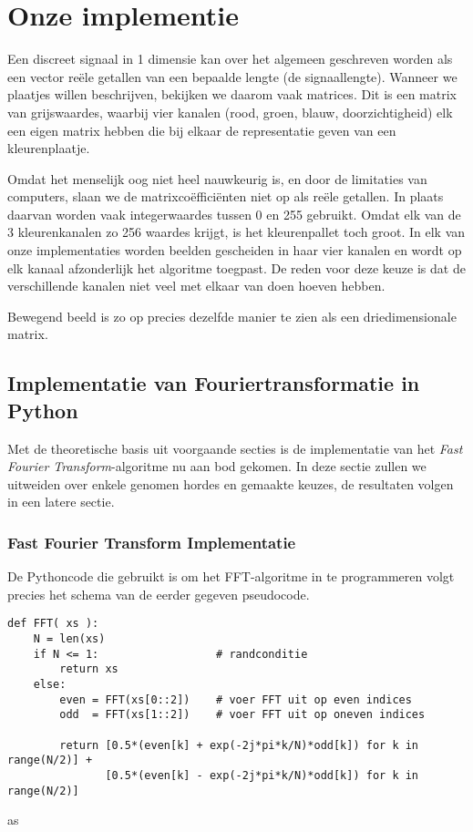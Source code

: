 \chapter{Onze implementie}
\label{implementatieH}
Een discreet signaal in 1 dimensie kan over het algemeen geschreven worden als een vector re\"ele getallen van een bepaalde lengte (de signaallengte). Wanneer we plaatjes willen beschrijven, bekijken we daarom vaak matrices. Dit is een matrix van grijswaardes, waarbij vier kanalen (rood, groen, blauw, doorzichtigheid) elk een eigen matrix hebben die bij elkaar de representatie geven van een kleurenplaatje.

Omdat het menselijk oog niet heel nauwkeurig is, en door de limitaties van computers, slaan we de matrixco\"effici\"enten niet op als re\"ele getallen. In plaats daarvan worden vaak integerwaardes tussen 0 en 255 gebruikt. Omdat elk van de 3 kleurenkanalen zo 256 waardes krijgt, is het kleurenpallet toch groot. In elk van onze implementaties worden beelden gescheiden in haar vier kanalen en wordt op elk kanaal afzonderlijk het algoritme toegpast. De reden voor deze keuze is dat de verschillende kanalen niet veel met elkaar van doen hoeven hebben.

Bewegend beeld is zo op precies dezelfde manier te zien als een driedimensionale matrix.

\section{Implementatie van Fouriertransformatie in Python}
Met de theoretische basis uit voorgaande secties is de implementatie van het 
\emph{Fast Fourier Transform}-algoritme nu aan bod gekomen. 
In deze sectie zullen we uitweiden over enkele genomen hordes en gemaakte keuzes, de resultaten volgen
in een latere sectie.

\subsection{Fast Fourier Transform Implementatie}
De Pythoncode die gebruikt is om het FFT-algoritme in te programmeren volgt precies het schema van de eerder gegeven pseudocode.

\begin{lstlisting}[caption={FFT algoritme in Python, voert de pseudocode uit zoals in sectie~\ref{fft_sec}}]
def FFT( xs ):
    N = len(xs)
    if N <= 1:                  # randconditie
        return xs
    else:
        even = FFT(xs[0::2])    # voer FFT uit op even indices
        odd  = FFT(xs[1::2])    # voer FFT uit op oneven indices

        return [0.5*(even[k] + exp(-2j*pi*k/N)*odd[k]) for k in range(N/2)] + 
               [0.5*(even[k] - exp(-2j*pi*k/N)*odd[k]) for k in range(N/2)]
\end{lstlisting}as


